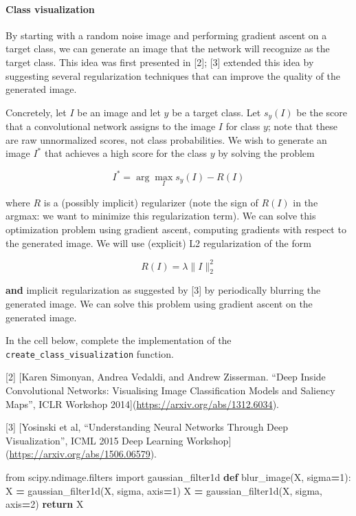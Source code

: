 \documentclass[]{book}
\newenvironment{Shaded}{\begin{snugshade}}{\end{snugshade}}
\newcommand{\KeywordTok}[1]{\textcolor[rgb]{0.13,0.29,0.53}{\textbf{#1}}}
\newcommand{\DecValTok}[1]{\textcolor[rgb]{0.00,0.00,0.81}{#1}}
\newcommand{\ImportTok}[1]{#1}
\newcommand{\ControlFlowTok}[1]{\textcolor[rgb]{0.13,0.29,0.53}{\textbf{#1}}}
\newcommand{\OperatorTok}[1]{\textcolor[rgb]{0.81,0.36,0.00}{\textbf{#1}}}
\newcommand{\NormalTok}[1]{#1}
\let\oldparagraph\paragraph
\renewcommand{\paragraph}[1]{\oldparagraph{#1}\mbox{}}
\theoremstyle{definition}
\theoremstyle{definition}
\theoremstyle{definition}
\theoremstyle{remark}
\begin{document}
\paragraph{Class visualization}\label{class-visualization}

By starting with a random noise image and performing gradient ascent on
a target class, we can generate an image that the network will recognize
as the target class. This idea was first presented in {[}2{]}; {[}3{]}
extended this idea by suggesting several regularization techniques that
can improve the quality of the generated image.

Concretely, let \(I\) be an image and let \(y\) be a target class. Let
\(s_y(I)\) be the score that a convolutional network assigns to the
image \(I\) for class \(y\); note that these are raw unnormalized
scores, not class probabilities. We wish to generate an image \(I^*\)
that achieves a high score for the class \(y\) by solving the problem

\[
I^* = \arg\max_I s_y(I) - R(I)
\]

where \(R\) is a (possibly implicit) regularizer (note the sign of
\(R(I)\) in the argmax: we want to minimize this regularization term).
We can solve this optimization problem using gradient ascent, computing
gradients with respect to the generated image. We will use (explicit) L2
regularization of the form

\[
R(I) = \lambda \|I\|_2^2
\]

\textbf{and} implicit regularization as suggested by {[}3{]} by
periodically blurring the generated image. We can solve this problem
using gradient ascent on the generated image.

In the cell below, complete the implementation of the
\texttt{create\_class\_visualization} function.

{[}2{]} {[}Karen Simonyan, Andrea Vedaldi, and Andrew Zisserman. ``Deep
Inside Convolutional Networks: Visualising Image Classification Models
and Saliency Maps'', ICLR Workshop
2014{]}(\url{https://arxiv.org/abs/1312.6034}).

{[}3{]} {[}Yosinski et al, ``Understanding Neural Networks Through Deep
Visualization'', ICML 2015 Deep Learning
Workshop{]}(\url{https://arxiv.org/abs/1506.06579}).

\begin{Shaded}
\begin{Highlighting}[]
\ImportTok{from}\NormalTok{ scipy.ndimage.filters }\ImportTok{import}\NormalTok{ gaussian_filter1d}
\KeywordTok{def}\NormalTok{ blur_image(X, sigma}\OperatorTok{=}\DecValTok{1}\NormalTok{):}
\NormalTok{    X }\OperatorTok{=}\NormalTok{ gaussian_filter1d(X, sigma, axis}\OperatorTok{=}\DecValTok{1}\NormalTok{)}
\NormalTok{    X }\OperatorTok{=}\NormalTok{ gaussian_filter1d(X, sigma, axis}\OperatorTok{=}\DecValTok{2}\NormalTok{)}
    \ControlFlowTok{return}\NormalTok{ X}
\end{Highlighting}
\end{Shaded}
\end{document}
